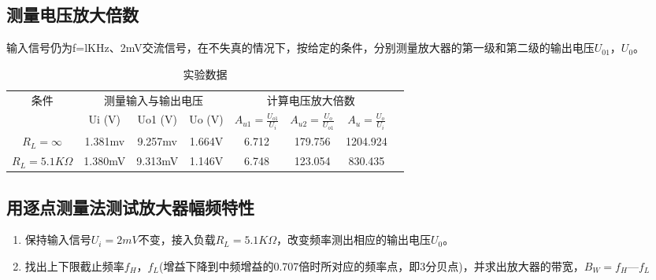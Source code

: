 \documentclass[dvipsnames, svgnames,a4paper,11pt]{article}
\begin{document}
	\subsection{测量电压放大倍数}
	输入信号仍为f=lKHz、2mV交流信号，在不失真的情况下，按给定的条件，分别测量放大器的第一级和第二级的输出电压$U_{01}$，$U_0$。
	\begin{table}[ht]
		\centering
		\caption{实验数据}
		\begin{tabular}{|c|c|c|c|c|c|c|c|}
			\hline
			\multirow{2}{*}{条件} & \multicolumn{3}{c|}{测量输入与输出电压} & \multicolumn{3}{c|}{计算电压放大倍数}\\
			\cline{2-7}
			 & Ui (V) & Uo1 (V) & Uo (V)& $ A_{u1} = \frac{U_{o1}}{U_i}$ &$ A_{u2} = \frac{U_o}{U_{o1}}$ & $A_u = \frac{U_o}{U_i}$\\
			\hline
			
			\hline
			 $R_L=\infty$ &1.381mv&9.257mv &1.664V&6.712&179.756&1204.924\\
			\hline
			 $R_L=5.1K\Omega $&1.380mV&9.313mV&1.146V&6.748&123.054 &830.435\\
			\hline
		\end{tabular}
		
		
		\end{table}
		\subsection{用逐点测量法测试放大器幅频特性}
		\begin{enumerate}
			\item 保持输入信号$U_i=2mV$不变，接入负载$R_L=5.1K\Omega$，改变频率测出相应的输出电压$U_0$。
			\item 找出上下限截止频率$f_H$，$f_L$(增益下降到中频增益的0.707倍时所对应的频率点，即3分贝点)，并求出放大器的带宽，$B_W=f_H—f_L$
		\end{enumerate}
	
\end{document}
